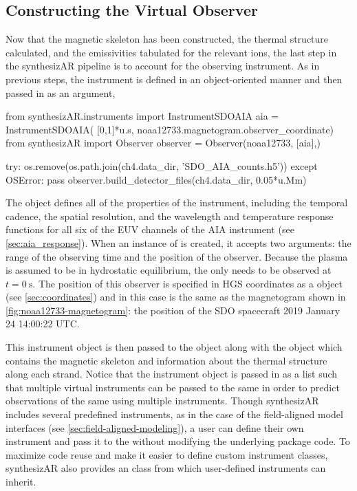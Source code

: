 \subsection{Constructing the Virtual Observer}

Now that the magnetic skeleton has been constructed, the thermal structure calculated, and the emissivities tabulated for the relevant ions, the last step in the synthesizAR pipeline is to account for the observing instrument. As in previous steps, the instrument is defined in an object-oriented manner and then passed in as an argument,
\begin{pyblock}[chapter4][baselinestretch=1,xleftmargin=3em]
from synthesizAR.instruments import InstrumentSDOAIA
aia = InstrumentSDOAIA(
    [0,1]*u.s, noaa12733.magnetogram.observer_coordinate)
from synthesizAR import Observer
observer = Observer(noaa12733, [aia],)
\end{pyblock}
\begin{pycode}[chapter4]
try:
    os.remove(os.path.join(ch4.data_dir, 'SDO_AIA_counts.h5'))
except OSError:
    pass
observer.build_detector_files(ch4.data_dir, 0.05*u.Mm)
\end{pycode}
The  object defines all of the properties of the instrument, including the temporal cadence, the spatial resolution, and the wavelength and temperature response functions for all six of the EUV channels of the AIA instrument (see \autoref{sec:aia_response}). When an instance of  is created, it accepts two arguments: the range of the observing time and the position of the observer. Because the plasma is assumed to be in hydrostatic equilibrium, the \AR{} only needs to be observed at $t=\SI{0}{\second}$. The position of this observer is specified in HGS coordinates as a  object (see \autoref{sec:coordinates}) and in this case is the same as the magnetogram shown in \autoref{fig:noaa12733-magnetogram}: the position of the SDO spacecraft 2019 January 24 14:00:22 UTC.

This instrument object is then passed to the  object along with the  object which contains the magnetic skeleton and information about the thermal structure along each strand. Notice that the instrument object is passed in as a list such that multiple virtual instruments can be passed to the same  in order to predict observations of the same \AR{} using multiple instruments. Though synthesizAR includes several predefined instruments, as in the case of the field-aligned model interfaces (see \autoref{sec:field-aligned-modeling}), a user can define their own instrument and pass it to the  without modifying the underlying package code. To maximize code reuse and make it easier to define custom instrument classes, synthesizAR also provides an  class from which user-defined instruments can inherit.

